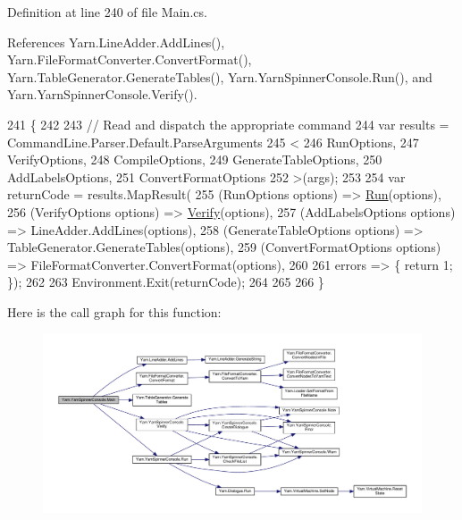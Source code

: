 Definition at line 240 of file Main.\-cs.



References Yarn.\-Line\-Adder.\-Add\-Lines(), Yarn.\-File\-Format\-Converter.\-Convert\-Format(), Yarn.\-Table\-Generator.\-Generate\-Tables(), Yarn.\-Yarn\-Spinner\-Console.\-Run(), and Yarn.\-Yarn\-Spinner\-Console.\-Verify().


\begin{DoxyCode}
241         \{
242 
243             \textcolor{comment}{// Read and dispatch the appropriate command}
244             var results = CommandLine.Parser.Default.ParseArguments
245             <
246             RunOptions,
247             VerifyOptions,
248             CompileOptions,
249             GenerateTableOptions,
250             AddLabelsOptions,
251             ConvertFormatOptions
252             >(args);
253 
254             var returnCode = results.MapResult(
255                 (RunOptions options) => \hyperlink{a00172_a1b974c55540795a9e643c2ec055fbd51}{Run}(options),
256                 (VerifyOptions options) => \hyperlink{a00172_a029a5624e7cc3a16ae586b64f13049de}{Verify}(options),
257                 (AddLabelsOptions options) => LineAdder.AddLines(options),
258                 (GenerateTableOptions options) => TableGenerator.GenerateTables(options),
259                 (ConvertFormatOptions options) => FileFormatConverter.ConvertFormat(options),
260 
261                 errors => \{ \textcolor{keywordflow}{return} 1; \});
262 
263             Environment.Exit(returnCode);
264 
265 
266         \}
\end{DoxyCode}


Here is the call graph for this function\-:
\nopagebreak
\begin{figure}[H]
\begin{center}
\leavevmode
\includegraphics[width=350pt]{a00172_a1d71ff2eb190449ea1d42ce86f44489f_cgraph}
\end{center}
\end{figure}


